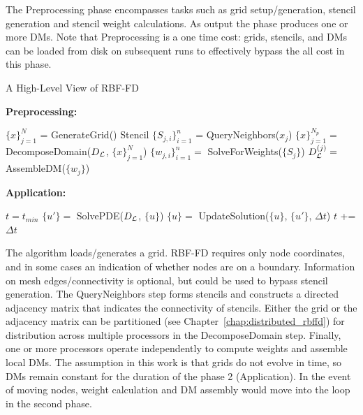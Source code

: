 \documentclass[11pt]{report}
\begin{document}
{The Preprocessing phase encompasses tasks such as grid setup/generation, stencil generation and stencil weight calculations. As output the phase produces one or more DMs. Note that Preprocessing is a one time cost: grids, stencils, and DMs can be loaded from disk on subsequent runs to effectively bypass the all cost in this phase. 

\begin{algorithm}                      
\caption{A High-Level View of RBF-FD}          
\label{alg:rbffd_high_level}                           
\textbf{Preprocessing:}
\begin{algorithmic}[0]                   
    \State $\{x\}_{j=1}^N$ = GenerateGrid()
   	 \label{alg:stencil_gen} 
   	    \State Stencil $\{S_{j,i}\}_{i=1}^{n}$ = QueryNeighbors($x_j$)
   	\EndFor
    \State $\{x\}_{j=1}^{N_p} = $ DecomposeDomain($D_{\mathcal{L}}$, $\{x\}_{j=1}^N$)
     \label{alg:weight_calc} 
   	    \State $\{w_{j,i}\}_{i=1}^{n} = $ SolveForWeights($\{S_j\}$)
   	    \State $D_{\mathcal{L}}^{(j)} = $ AssembleDM($\{w_j\}$)     
    \EndFor
\end{algorithmic}
\textbf{Application:}
\begin{algorithmic}[1] 
    \State $t = t_{min}$                
        \State $\{u'\} =$ SolvePDE($D_{\mathcal{L}}$, $\{u\}$)
        \State $\{u\} =$ UpdateSolution($\{u\}$, $\{u'\}$, $\Delta t$)
        \State $t$ += $\Delta t$
    \EndWhile
\end{algorithmic}
\end{algorithm}

The algorithm loads/generates a grid. RBF-FD requires only node coordinates, and in some cases an indication of whether nodes are on a boundary. Information on mesh edges/connectivity is optional, but could be used to bypass stencil generation. The QueryNeighbors step forms stencils and constructs a directed adjacency matrix that indicates the connectivity of stencils. Either the grid or the adjacency matrix can be partitioned (see Chapter~\ref{chap:distributed_rbffd}) for distribution across multiple processors in the DecomposeDomain step. Finally, one or more processors operate independently to compute weights and assemble local DMs. The assumption in this work is that grids do not evolve in time, so DMs remain constant for the duration of the phase 2 (Application). In the event of moving nodes, weight calculation and DM assembly would move into the loop in the second phase. 



}
\end{document}
